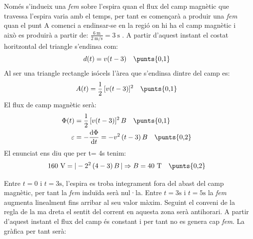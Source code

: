 \begin{solapartat}
Només s'indueix una \textit{fem} sobre l'espira quan el flux del camp magnètic que travessa l'espira varia amb el temps,  per tant es començarà a produir una \textit{fem} quan el punt A comenci a endinsar-se en la regió on hi ha el camp magnètic  i això es produirà a partir de: $\frac{6\ \mathrm{m}}{2\ \mathrm{m/s}} = 3\ \mathrm{s}$ . A partir d'aquest instant el costat horitzontal del triangle s'endinsa com:
\[ d(t) = v(t - 3) \quad \text{\punts{0,1}} \]
Al ser una triangle rectangle isócels l'àrea que s'endinsa dintre del camp es:
\[ A(t) = \frac{1}{2}\,[v(t - 3)]^2 \quad \text{\punts{0,1}} \]
El flux de camp magnètic serà:
\begin{align*}
\Phi(t) &= \frac{1}{2}\,[v(t - 3)]^2\,B \quad \text{\punts{0,1}}\\
\varepsilon &= -\frac{\mathrm{d}\Phi}{\mathrm{d}t} = -v^2\,(t - 3)\,B \quad \text{\punts{0,2}}
\end{align*}
El enunciat ens diu que per t= 4s tenim:
\[ 160\ \mathrm{V} = |-2^2\,(4 - 3)\,B\,| \Rightarrow B = 40\ \mathrm{T} \quad \text{\punts{0,2}} \]
\end{solapartat}

\begin{solapartat}
Entre $t = 0$ i $t = 3\mathrm{s}$, l'espira es troba integrament fora del abast del camp magnètic, per tant la \textit{fem} induïda serà nul·la.  Entre $t = 3\mathrm{s}$ i $t = 5\mathrm{s}$ la \textit{fem} augmenta linealment fins arribar al seu valor màxim.  Seguint el conveni de la regla de la ma dreta el sentit del corrent en aquesta zona serà antihorari.  A partir d'aquest instant el flux del camp és constant i per tant no es genera cap \textit{fem}.  La gràfica per tant serà:
\end{solapartat}
